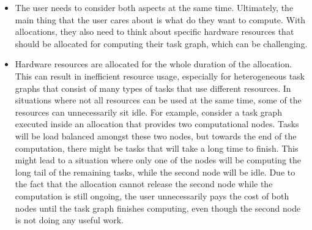 \begin{itemize}
	\item The user needs to consider both aspects at the same time. Ultimately, the main thing that the user
	      cares about is what do they want to compute. With allocations, they also need to think about
	      specific hardware resources that should be allocated for computing their task graph, which can be
	      challenging.
	\item Hardware resources are allocated for the whole duration of the allocation. This can result in
	      inefficient resource usage, especially for heterogeneous task graphs that consist of many types of
	      tasks that use different resources. In situations where not all resources can be used at the same
	      time, some of the resources can unnecessarily sit idle. For example, consider a task graph executed
	      inside an allocation that provides two computational nodes. Tasks will be load balanced amongst
	      these two nodes, but towards the end of the computation, there might be tasks that will take a long
	      time to finish. This might lead to a situation where only one of the nodes will be computing the
	      long tail of the remaining tasks, while the second node will be idle. Due to the fact that the
	      allocation cannot release the second node while the computation is still ongoing, the user
	      unnecessarily pays the cost of both nodes until the task graph finishes computing, even though the
	      second node is not doing any useful work.


\end{itemize}
